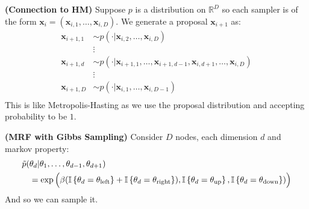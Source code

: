 \begin{remark}{\textbf{(Connection to HM)}}
    Suppose $p$ is a distribution on $\mathbb{R}^D$ so each sampler is of the form $\boldsymbol x_i = (\boldsymbol x_{i, 1},\dots, \boldsymbol x_{i, D})$. We generate a proposal $\boldsymbol x_{i+1}$ as:
    \begin{equation*}
    \begin{aligned}
        \boldsymbol x_{i+1, 1} &\sim p(\cdot | \boldsymbol x_{i, 2},\dots,\boldsymbol x_{i, D}) \\
        &\vdots \\
        \boldsymbol x_{i+1, d} &\sim p(\cdot | \boldsymbol x_{i+1,1},\dots,\boldsymbol x_{i+1, d-1}, \boldsymbol x_{i, d+1},\dots,\boldsymbol x_{i, D}) \\
        &\vdots \\
        \boldsymbol x_{i+1, D} &\sim p(\cdot | \boldsymbol x_{i, 1},\dots,\boldsymbol x_{i, D-1}) \\
    \end{aligned}
    \end{equation*}
    This is like Metropolis-Hasting as we use the proposal distribution and accepting probability to be $1$. 
\end{remark}

\begin{remark}{\textbf{(MRF with Gibbs Sampling)}}
    Consider $D$ nodes, each dimension $d$ and markov property:
    \begin{equation*}
    \begin{aligned}
        \tilde{p}(&\theta_d | \theta_1,\dots, \theta_{d-1},\theta_{d+1})  \\
        &= \exp\Big(\beta(\mathbb{I}\left\{ \theta_d = \theta_\text{left} \right\} + \mathbb{I}\left\{ \theta_d = \theta_\text{right} \right\}), \mathbb{I}\left\{ \theta_d = \theta_\text{up} \right\}, \mathbb{I}\left\{ \theta_d = \theta_\text{down} \right\})\Big)
    \end{aligned}
    \end{equation*}
    And so we can sample it.
\end{remark}

